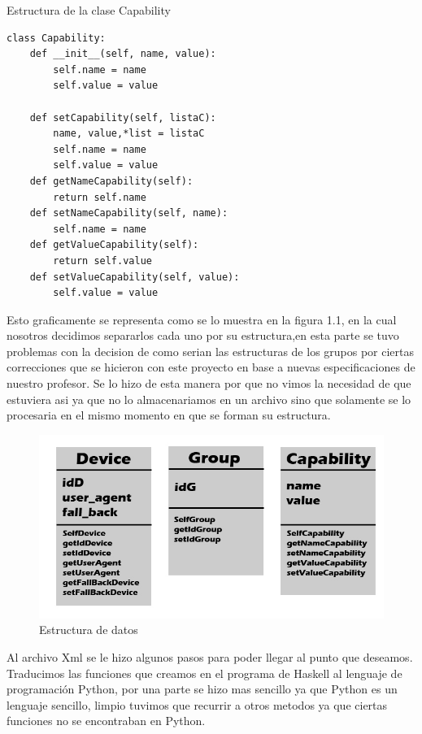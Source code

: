 \documentclass[a4paper,openright,12pt]{report}
\begin{document}
Estructura de la clase Capability
\begin{lstlisting}[frame=single]  % Start your code-block
class Capability:
    def __init__(self, name, value):
        self.name = name
        self.value = value

    def setCapability(self, listaC):
        name, value,*list = listaC
        self.name = name
        self.value = value
    def getNameCapability(self):
        return self.name
    def setNameCapability(self, name):
        self.name = name
    def getValueCapability(self):
        return self.value
    def setValueCapability(self, value):
        self.value = value
\end{lstlisting}

Esto graficamente se representa como se lo muestra en la figura 1.1, en la cual nosotros decidimos separarlos cada uno por su estructura,en esta parte se tuvo problemas con la decision de como serian las estructuras de los grupos por ciertas correcciones que se hicieron con este proyecto en base a nuevas especificaciones de nuestro profesor. Se lo hizo de esta manera por que no vimos la necesidad de que estuviera asi ya que no lo almacenariamos en un archivo sino que solamente se lo procesaria en el mismo momento en que se forman su estructura.\\
\begin{figure}[htbp]
	\begin{center}
		\includegraphics[width=.90\textwidth]{./imagenes/estructuras_python.jpg}
		\caption{Estructura de datos}
		\label{Estructura de datos}
	\end{center}
\end{figure}

Al archivo Xml se le hizo algunos pasos para poder llegar al punto que deseamos. Traducimos las funciones que creamos en
el programa de Haskell al lenguaje de programación Python, por una parte se hizo mas sencillo ya que Python es un lenguaje 
sencillo, limpio tuvimos que recurrir a otros metodos ya que ciertas funciones no se encontraban en Python. 
\end{document}

